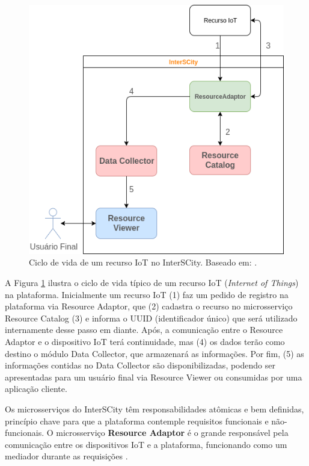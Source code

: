 \pagebreak
\begin{figure}[hbt]
  \centering
    \includegraphics[scale=0.5]{figuras/interscity_flow.png}
  \caption{Ciclo de vida de um recurso IoT no InterSCity. Baseado em: .}

  \label{fig:interscity-lifecycle}
\end{figure}

A Figura \ref{fig:interscity-lifecycle} ilustra o ciclo de vida típico de um
recurso IoT (\textit{Internet of Things}) na plataforma. Inicialmente um recurso IoT (1) faz um pedido de
registro na plataforma via Resource Adaptor, que (2) cadastra o recurso no
microsserviço Resource Catalog (3) e informa o UUID
(identificador único) que será utilizado internamente desse passo em diante.
Após, a comunicação entre o Resource Adaptor e o dispositivo IoT terá
continuidade, mas (4) os dados terão como destino o módulo Data Collector,
que armazenará as informações. Por fim, (5) as informações contidas no
Data Collector são disponibilizadas, podendo ser apresentadas para um usuário
final via Resource Viewer ou consumidas por uma aplicação cliente.

Os microsserviços do InterSCity têm responsabilidades atômicas e bem
definidas, princípio chave para que a plataforma contemple requisitos funcionais
e não-funcionais. O microsserviço \textbf{Resource Adaptor} é o grande
responsável pela comunicação entre os dispositivos IoT e a plataforma,
funcionando como um mediador durante as requisições \cite{delesposte2017}.

